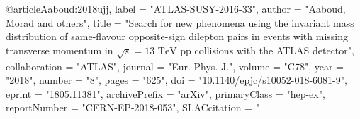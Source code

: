 @article{Aaboud:2018ujj,
      label          = "ATLAS-SUSY-2016-33",
      author         = "Aaboud, Morad and others",
      title          = "{Search for new phenomena using the invariant mass
                        distribution of same-flavour opposite-sign dilepton pairs
                        in events with missing transverse momentum in
                        $\sqrt{s}=13$   $\text {Te}\text {V}$ pp collisions with
                        the ATLAS detector}",
      collaboration  = "ATLAS",
      journal        = "Eur. Phys. J.",
      volume         = "C78",
      year           = "2018",
      number         = "8",
      pages          = "625",
      doi            = "10.1140/epjc/s10052-018-6081-9",
      eprint         = "1805.11381",
      archivePrefix  = "arXiv",
      primaryClass   = "hep-ex",
      reportNumber   = "CERN-EP-2018-053",
      SLACcitation   = "%
}

